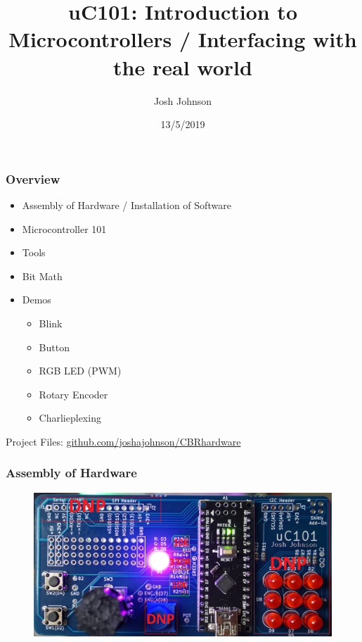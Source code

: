 \documentclass[t]{beamer}
\title[uC101]{uC101: Introduction to Microcontrollers / Interfacing with the real world} %
\author{Josh Johnson} %
\institute[] %
{ \\ %
\medskip
\textit{} %
}
\date{13/5/2019} %
\begin{document}
\begin{frame}
\titlepage %
\end{frame}


\begin{frame}
\frametitle{Overview}
\begin{itemize}
\item Assembly of Hardware / Installation of Software
\item Microcontroller 101
\item Tools
\item Bit Math
\item Demos
\begin{itemize}
	\item Blink
	\item Button
	\item RGB LED (PWM)
	\item Rotary Encoder
	\item Charlieplexing
\end{itemize}
	

\end{itemize}
\vspace{20mm}
Project Files: \url{github.com/joshajohnson/CBRhardware}\\
\end{frame}


\begin{frame}[t]
\frametitle{Assembly of Hardware}

\begin{figure}
	\includegraphics[width=1\linewidth]{hardware.jpg}
\end{figure}

\end{frame}
\end{document}
